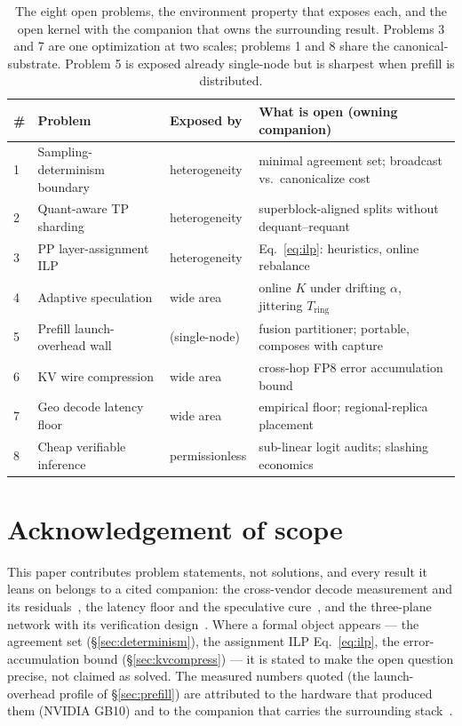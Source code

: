 \documentclass[11pt]{article}
\newcommand{\Tring}{\ensuremath{T_{\mathrm{ring}}}}
\begin{document}
\begin{table}[t]
\centering
\small
\setlength{\tabcolsep}{5pt}
\begin{tabular}{@{}p{0.4cm}p{4.5cm}p{2.2cm}p{5.1cm}@{}}
\toprule
\# & \textbf{Problem} & \textbf{Exposed by} & \textbf{What is open (owning companion)} \\
\midrule
1 & Sampling-determinism boundary & heterogeneity & minimal agreement set; broadcast vs.\ canonicalize cost~\cite{het} \\
2 & Quant-aware TP sharding & heterogeneity & superblock-aligned splits without dequant--requant~\cite{het} \\
3 & PP layer-assignment ILP & heterogeneity & Eq.~\eqref{eq:ilp}: heuristics, online rebalance~\cite{het,latency} \\
4 & Adaptive speculation & wide area & online $K$ under drifting $\alpha$, jittering $\Tring$~\cite{latency} \\
5 & Prefill launch-overhead wall & (single-node) & fusion partitioner; portable, composes with capture~\cite{fuse,backend} \\
6 & KV wire compression & wide area & cross-hop FP8 error accumulation bound~\cite{latency} \\
7 & Geo decode latency floor & wide area & empirical floor; regional-replica placement~\cite{latency} \\
8 & Cheap verifiable inference & permissionless & sub-linear logit audits; slashing economics~\cite{consensus} \\
\bottomrule
\end{tabular}
\caption{The eight open problems, the environment property that exposes each, and the open kernel with the
companion that owns the surrounding result. Problems 3 and 7 are one optimization at two scales; problems 1
and 8 share the canonical- substrate. Problem 5 is exposed already single-node but is sharpest
when prefill is distributed.}
\label{tab:map}
\end{table}

\section*{Acknowledgement of scope}
This paper contributes problem statements, not solutions, and every result it leans on belongs to a cited
companion: the cross-vendor decode measurement and its residuals~\cite{het}, the latency floor and the
speculative cure~\cite{latency}, and the three-plane network with its verification design~\cite{consensus}.
Where a formal object appears --- the agreement set (\S\ref{sec:determinism}), the assignment ILP
Eq.~\eqref{eq:ilp}, the error-accumulation bound (\S\ref{sec:kvcompress}) --- it is stated to make the open
question precise, not claimed as solved. The measured numbers quoted (the launch-overhead profile of
\S\ref{sec:prefill}) are attributed to the hardware that produced them (NVIDIA GB10) and to the companion
that carries the surrounding stack~\cite{backend}.
\end{document}
